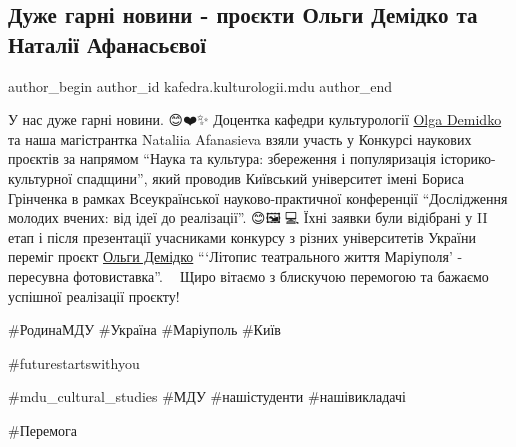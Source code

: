  
 
 
 
 

\subsection{Дуже гарні новини - проєкти Ольги Демідко та Наталії Афанасьєвої}
\label{sec:21_04_2023.fb.kafedra.kulturologii.mdu.1.proekt_olgy_demidko_litopys_teatr_zhyttja_mrpl_peresuvna_fotovystavka}

\ifcmt
 author_begin
   author_id kafedra.kulturologii.mdu
 author_end
\fi


У нас дуже гарні новини. 😊❤️✨️ Доцентка кафедри культурології \href{\urlDemidkoIA}{Olga Demidko}  та
наша магістрантка Nataliia Afanasieva взяли участь у Конкурсі наукових проєктів
за напрямом \enquote{Наука та культура: збереження і популяризація історико-культурної
спадщини}, який проводив Київський університет імені Бориса Грінченка в рамках
Всеукраїнської науково-практичної конференції \enquote{Дослідження молодих вчених: від
ідеї до реалізації}. 😊🖼👩💻 Їхні заявки були відібрані у II етап і
після презентації учасниками конкурсу з різних університетів України переміг
проєкт \href{\urlDemidkoIA}{Ольги Демідко} \enquote{\enquote{Літопис театрального життя Маріуполя} - пересувна
фотовиставка}. 🎉👏 Щиро вітаємо з блискучою перемогою та бажаємо успішної
реалізації проєкту!💐🤗

\#РодинаМДУ  \#Україна \#Маріуполь \#Київ

\#futurestartswithyou  

\#mdu\_cultural\_studies \#МДУ  \#нашістуденти \#нашівикладачі

\#Перемога
